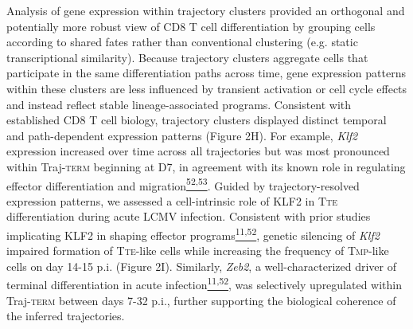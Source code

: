 Analysis of gene expression within trajectory clusters provided an
orthogonal and potentially more robust view of CD8 T cell
differentiation by grouping cells according to shared fates rather than
conventional clustering (e.g. static transcriptional similarity).
Because trajectory clusters aggregate cells that participate in the same
differentiation paths across time, gene expression patterns within these
clusters are less influenced by transient activation or cell cycle
effects and instead reflect stable lineage-associated programs.
Consistent with established CD8 T cell biology, trajectory clusters
displayed distinct temporal and path-dependent expression patterns
(Figure 2H). For example, \emph{Klf2} expression increased over time
across all trajectories but was most pronounced within
Traj-\textsc{term} beginning at D7, in agreement with its known role in
regulating effector differentiation and
migration\href{https://sciwheel.com/work/citation?ids=17508518,329098\&pre=\&pre=\&suf=\&suf=\&sa=0,0\&dbf=0\&dbf=0}{\textsuperscript{52,53}}.
Guided by trajectory-resolved expression patterns, we assessed a
cell-intrinsic role of KLF2 in T\textsc{te} differentiation during acute
LCMV infection. Consistent with prior studies implicating KLF2 in
shaping effector
programs\href{https://sciwheel.com/work/citation?ids=17508518,17904669\&pre=\&pre=\&suf=\&suf=\&sa=0,0\&dbf=0\&dbf=0}{\textsuperscript{11,52}},
genetic silencing of \emph{Klf2} impaired formation of T\textsc{te}-like
cells while increasing the frequency of T\textsc{mp}-like cells on day
14-15 p.i. (Figure 2I). Similarly, \emph{Zeb2}, a well-characterized
driver of terminal differentiation in acute
infection\href{https://sciwheel.com/work/citation?ids=17904669,17508518\&pre=\&pre=\&suf=\&suf=\&sa=0,0\&dbf=0\&dbf=0}{\textsuperscript{11,52}},
was selectively upregulated within Traj-\textsc{term} between days 7-32
p.i., further supporting the biological coherence of the inferred
trajectories.

